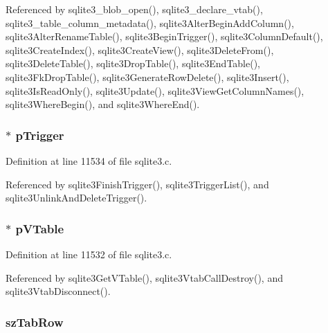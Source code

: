 Referenced by sqlite3\+\_\+blob\+\_\+open(), sqlite3\+\_\+declare\+\_\+vtab(), sqlite3\+\_\+table\+\_\+column\+\_\+metadata(), sqlite3\+Alter\+Begin\+Add\+Column(), sqlite3\+Alter\+Rename\+Table(), sqlite3\+Begin\+Trigger(), sqlite3\+Column\+Default(), sqlite3\+Create\+Index(), sqlite3\+Create\+View(), sqlite3\+Delete\+From(), sqlite3\+Delete\+Table(), sqlite3\+Drop\+Table(), sqlite3\+End\+Table(), sqlite3\+Fk\+Drop\+Table(), sqlite3\+Generate\+Row\+Delete(), sqlite3\+Insert(), sqlite3\+Is\+Read\+Only(), sqlite3\+Update(), sqlite3\+View\+Get\+Column\+Names(), sqlite3\+Where\+Begin(), and sqlite3\+Where\+End().

\hypertarget{struct_table_a93ec67e81c981e01944d8fc6ab564fec}{}
\subsubsection[{p\+Trigger}]{$\ast$ p\+Trigger}\label{struct_table_a93ec67e81c981e01944d8fc6ab564fec}


Definition at line 11534 of file sqlite3.\+c.



Referenced by sqlite3\+Finish\+Trigger(), sqlite3\+Trigger\+List(), and sqlite3\+Unlink\+And\+Delete\+Trigger().

\hypertarget{struct_table_a8d76cc75cc811868888fbf6bf8b3a460}{}
\subsubsection[{p\+V\+Table}]{$\ast$ p\+V\+Table}\label{struct_table_a8d76cc75cc811868888fbf6bf8b3a460}


Definition at line 11532 of file sqlite3.\+c.



Referenced by sqlite3\+Get\+V\+Table(), sqlite3\+Vtab\+Call\+Destroy(), and sqlite3\+Vtab\+Disconnect().

\hypertarget{struct_table_a7eafe67f3b311efdeb6344e5086cba08}{}
\subsubsection[{sz\+Tab\+Row}]{ sz\+Tab\+Row}\label{struct_table_a7eafe67f3b311efdeb6344e5086cba08}



